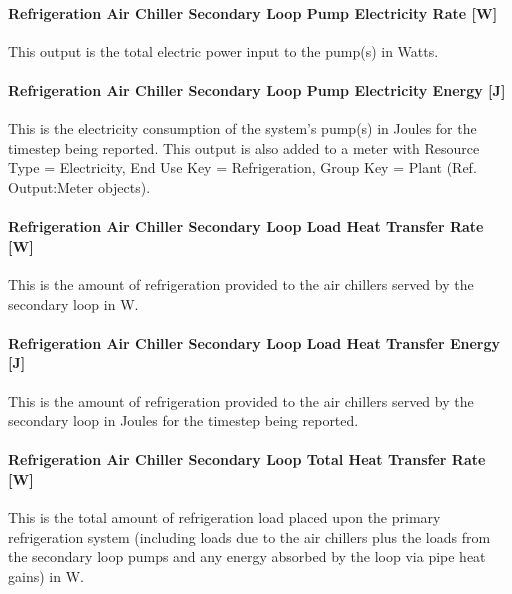 \paragraph{Refrigeration Air Chiller Secondary Loop Pump Electricity Rate {[}W{]}}\label{refrigeration-air-chiller-secondary-loop-pump-electric-power-w}

This output is the total electric power input to the pump(s) in Watts.

\paragraph{Refrigeration Air Chiller Secondary Loop Pump Electricity Energy {[}J{]}}\label{refrigeration-air-chiller-secondary-loop-pump-electric-energy-j}

This is the electricity consumption of the system's pump(s) in Joules for the timestep being reported. This output is also added to a meter with Resource Type = Electricity, End Use Key = Refrigeration, Group Key = Plant (Ref. Output:Meter objects).

\paragraph{Refrigeration Air Chiller Secondary Loop Load Heat Transfer Rate {[}W{]}}\label{refrigeration-air-chiller-secondary-loop-load-heat-transfer-rate-w}

This is the amount of refrigeration provided to the air chillers served by the secondary loop in W.

\paragraph{Refrigeration Air Chiller Secondary Loop Load Heat Transfer Energy {[}J{]}}\label{refrigeration-air-chiller-secondary-loop-load-heat-transfer-energy-j}

This is the amount of refrigeration provided to the air chillers served by the secondary loop in Joules for the timestep being reported.

\paragraph{Refrigeration Air Chiller Secondary Loop Total Heat Transfer Rate {[}W{]}}\label{refrigeration-air-chiller-secondary-loop-total-heat-transfer-rate-w}

This is the total amount of refrigeration load placed upon the primary refrigeration system (including loads due to the air chillers plus the loads from the secondary loop pumps and any energy absorbed by the loop via pipe heat gains) in W.

